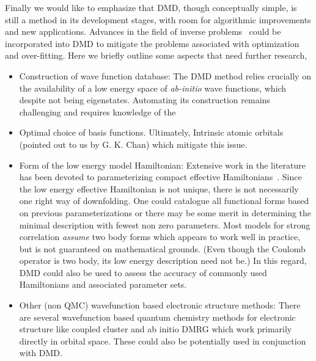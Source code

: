 Finally we would like to emphasize that DMD, though conceptually simple, 
is still a method in its development stages, with room for algorithmic improvements and new applications. 
Advances in the field of inverse problems~\cite{Berg2017} could be incorporated into DMD to 
mitigate the problems associated with optimization and over-fitting. 
Here we briefly outline some aspects that need further research,
\begin{itemize} 
	\item Construction of wave function database:
	The DMD method relies crucially on the availability of a low energy space of \textit{ab-initio} wave functions, which despite not being eigenstates. Automating its construction remains challenging and requires knowledge of the 
	\item Optimal choice of basis functions. Ultimately, Intrinsic atomic orbitals (pointed out to us by G. K. Chan) which mitigate this issue. 
	\item Form of the low energy model Hamiltonian:
	Extensive work in the literature has been devoted to parameterizing compact effective Hamiltonians~\cite{Georges, Oles, Coury}. 
	Since the low energy effective Hamiltonian is not unique, there is not necessarily one right way of downfolding. 
	One could catalogue all functional forms based on previous parameterizations 
	or there may be some merit in determining the minimal description with fewest non zero parameters.
	Most models for strong correlation \textit{assume} two body forms which appears to work well in practice, 
	but is not guaranteed on mathematical grounds. (Even though the Coulomb operator is two body, 
	its low energy description need not be.) In this regard, DMD could also be used to assess 
	the accuracy of commonly used Hamiltonians and associated parameter sets.
	\item Other (non QMC) wavefunction based electronic structure methods:
	There are several wavefunction based quantum chemistry 
	methods for electronic structure like coupled cluster and ab initio DMRG which work primarily 
	directly in orbital space. These could also be potentially used in conjunction with DMD.
\end{itemize} 

